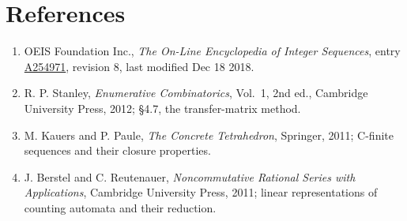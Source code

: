\documentclass[11pt]{article}
\theoremstyle{definition}
\begin{document}
\section{References}

\begin{enumerate}

\item OEIS Foundation Inc., \emph{The On-Line Encyclopedia of Integer Sequences}, entry \href{https://oeis.org/A254971}{A254971}, revision 8, last modified Dec 18 2018.

\item R. P. Stanley, \emph{Enumerative Combinatorics}, Vol.~1, 2nd ed., Cambridge University Press, 2012; \S4.7, the transfer-matrix method.

\item M. Kauers and P. Paule, \emph{The Concrete Tetrahedron}, Springer, 2011; C-finite sequences and their closure properties.

\item J. Berstel and C. Reutenauer, \emph{Noncommutative Rational Series with Applications}, Cambridge University Press, 2011; linear representations of counting automata and their reduction.

\end{enumerate}
\end{document}
